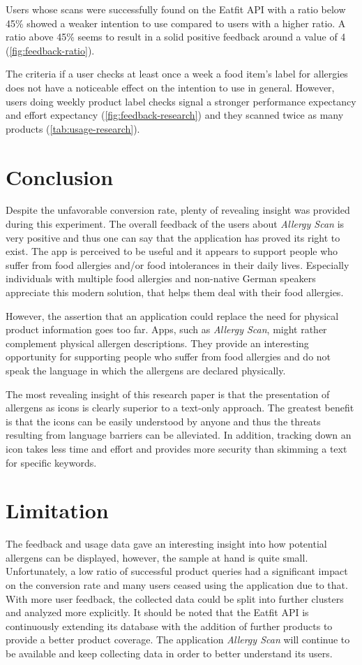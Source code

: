 Users whose scans were successfully found on the Eatfit API with a ratio below 45\% showed a weaker intention to use compared to users with a higher ratio. A ratio above 45\% seems to result in a solid positive feedback around a value of 4 (\cref{fig:feedback-ratio}).

The criteria if a user checks at least once a week a food item's label for allergies does not have a noticeable effect on the intention to use in general. However, users doing weekly product label checks signal a stronger performance expectancy and effort expectancy (\cref{fig:feedback-research}) and they scanned twice as many products (\cref{tab:usage-research}).


\section{Conclusion}
Despite the unfavorable conversion rate, plenty of revealing insight was provided during this experiment. The overall feedback of the users about \emph{Allergy Scan} is very positive and thus one can say that the application has proved its right to exist. The app is perceived to be useful and it appears to support people who suffer from food allergies and/or food intolerances in their daily lives. Especially individuals with multiple food allergies and non-native German speakers appreciate this modern solution, that helps them deal with their food allergies.

However, the assertion that an application could replace the need for physical product information goes too far. Apps, such as \emph{Allergy Scan}, might rather complement physical allergen descriptions. They provide an interesting opportunity for supporting people who suffer from food allergies and do not speak the language in which the allergens are declared physically. 

The most revealing insight of this research paper is that the presentation of allergens as icons is clearly superior to a text-only approach. The greatest benefit is that the icons can be easily understood by anyone and thus the threats resulting from language barriers can be alleviated. In addition, tracking down an icon takes less time and effort and provides more security than skimming a text for specific keywords.

\section{Limitation}
The feedback and usage data gave an interesting insight into how potential allergens can be displayed, however, the sample at hand is quite small. Unfortunately, a low ratio of successful product queries had a significant impact on the conversion rate and many users ceased using the application due to that. With more user feedback, the collected data could be split into further clusters and analyzed more explicitly. It should be noted that the Eatfit API is continuously extending its database with the addition of further products to provide a better product coverage. The application \emph{Allergy Scan} will continue to be available and keep collecting data in order to better understand its users.


